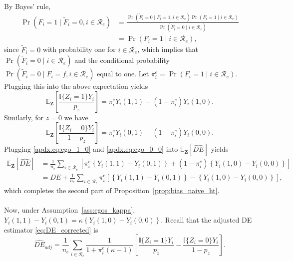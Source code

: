 \documentclass[11pt]{article}
\theoremstyle{definition}
\def \bZ {\boldsymbol{Z}}
\def \cR {\mathcal{R}}
\def \EX {\mathbb{E}}
\begin{document}
By Bayes' rule, 
\begin{align*}
    \Pr(F_i =1 \mid \widetilde{F}_i=0, i \in \cR_e) &=
    \frac{\Pr(\widetilde{F}_i=0 \mid F_i=1, i \in \cR_e) \Pr(F_i=1 \mid i \in \cR_e)}
    {\Pr(\widetilde{F}_i=0 \mid i \in \cR_e)}
    \\ &= \Pr(F_i=1 \mid i \in \cR_e),
\end{align*}
since $\widetilde{F}_i = 0$ with probability one for $i\in \cR_e$, which implies that 
$\Pr(\widetilde{F}_i=0 \mid i \in \cR_e)$ and the conditional probability
$\Pr(\widetilde{F}_i=0 \mid F_i = f ,i \in \cR_e)$ equal to one.
Let $\pi^e_i = \Pr(F_i =1 \mid i \in \cR_e)$. 
Plugging this into the above expectation yields 
\begin{equation}
    \label{apdx.eq:ego_1_0}
    \EX_{\bZ}\left[\frac{
    \mathbb{I}\{Z_i=1\}Y_i}{p_z} \right]
    = \pi_i^e Y_i(1,1) + (1-\pi_i^e)Y_i(1,0).
    \end{equation}
Similarly, for $z=0$ we have
\begin{equation}
    \label{apdx.eq:ego_0_0}
    \EX_{\bZ}\left[\frac{
    \mathbb{I}\{Z_i=0\}Y_i}{1-p_z} \right]
    = \pi_i^e Y_i(0,1) + (1-\pi_i^e)Y_i(0,0).
    \end{equation}
Plugging \eqref{apdx.eq:ego_1_0} and \eqref{apdx.eq:ego_0_0} into $\EX_{\bZ}\left[\widehat{DE}\right]$ yields
\begin{equation}
    \label{apdx.eq:ego_ht_bias}
    \begin{aligned}
    \EX_{\bZ}\left[\widehat{DE}\right]
    &=
     \frac{1}{n_e}
    \sum_{i \in \cR_e}
    \left[
    \pi_i^e\left\{Y_i(1,1) - Y_i(0,1)
    \right\}
    +
    (1-\pi_i^e)\left\{Y_i(1,0) - Y_i(0,0)
    \right\}
    \right]
    \\ &=
    DE + 
    \frac{1}{n_e} 
    \sum_{i\in\cR_e}
    \pi_i^e
    \left[
    \left\{ Y_i(1, 1) - Y_i(0,1)\right\} 
    - \left\{ Y_i(1,0) - Y_i(0,0)\right\}
    \right],
    \end{aligned}
\end{equation}
which completes the second part of Proposition~\ref{prop:bias_naive_ht}.
\\
\\
Now, under Assumption~\ref{ass:egos_kappa}, $Y_i(1,1)-Y_i(0,1) = \kappa \left\{Y_i(1,0) - Y_i(0,0) \right\}$. Recall that the adjusted DE estimator \eqref{eq:DE_corrected} is 
\begin{equation*}
       \widehat{DE}_{adj} =
    \frac{1}{n_e}
    \sum_{i \in \cR_e}
    \frac{1}{1 + \pi_i^e(\kappa-1)}
    \left[
    \frac{
    \mathbb{I}\{Z_i=1\}Y_i}{p_z} 
    -
    \frac{
    \mathbb{I}\{Z_i=0\}Y_i}{1 - p_z} 
    \right].
\end{equation*}
\end{document}
